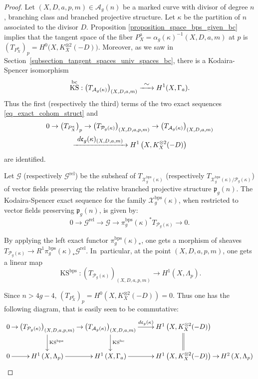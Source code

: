 \documentclass[10pt]{amsart}
\newcommand\To[1]{\mathchoice{\xrightarrow{\textstyle\kern4pt#1\kern3pt}}{\stackrel{#1}{\longrightarrow}}{}{}}
\newcommand{\BC}{\mathrm{bc}}
\newcommand{\BPS}{\mathrm{bps}}
\newcommand{\rel}{\mathrm{rel}}
\DeclareMathOperator{\KS}{KS}
\theoremstyle{definition}
\theoremstyle{plain}
\begin{document}
\begin{proof}
Let $(X, D, a, p, m) \in \mathcal A_g(n)$ be a marked curve with divisor of degree $n$, branching class and branched projective structure.
Let $\kappa$ be the partition of $n$ associated to the divisor $D$.
Proposition \ref{proposition_space_bps_given_bc} implies that the tangent space of the fiber $P_X^{a} = \alpha_g(\kappa)^{-1}(X, D, a, m)$ at $p$ is $(T_{P_X^a})_p = H^0\bigl(X, K_X^{\otimes 2}(-D)\bigr)$.
Moreover, as we saw in Section~\ref{subsection_tangent_spaces_univ_spaces_bc}, there is a Kodaira-Spencer isomorphism
\[
\KS^{\BC}: \left(T_{\mathcal A_g(\kappa)}\right)_{(X, D, a, m)} \To{\sim} H^1(X, \Gamma_a).
\]
Thus the first (respectively the third) terms of the two exact sequences \eqref{eq_exact_cohom_struct} and
\begin{multline*}
0 \to \left(T_{P_X^a}\right)_p \to \left(T_{\mathcal P_g(\kappa)}\right)_{(X, D, a, p, m)} \to \left(T_{\mathcal A_g(\kappa)}\right)_{(X, D, a, m)}\\
\To{d\mathfrak c_g(\kappa)_{(X, D, a, m)}} H^1\left(X, K_X^{\otimes 2}(-D)\right)
\end{multline*}
are identified.

Let $\mathcal G$ (respectively $\mathcal G^{\rel}$) be the subsheaf of $T_{\mathcal X_g^{\BPS}(\kappa)}$ (respectively $T_{\mathcal X_g^{\BPS}(\kappa)/\mathcal P_g(\kappa)}$) of vector fields preserving the relative branched projective structure $\mathfrak p_g(n)$.
The Kodaira-Spencer exact sequence for the family $\mathcal X^{\BPS}_g(\kappa)$, when restricted to vector fields preserving $\mathfrak p_g(n)$, is given by:
\begin{equation*}
0 \to \mathcal G^{\rel} \to \mathcal G \to \pi_g^{\BPS}(\kappa)^* T_{\mathcal P_g(\kappa)} \to 0.
\end{equation*}

By applying the left exact functor $\pi_g^{\BPS}(\kappa)_*$, one gets a morphism of sheaves $T_{\mathcal P_g(\kappa)} \to R^1 \pi_g^{\BPS}(\kappa)_* \mathcal G^{\rel}$. In~particular, at the point $(X, D, a, p, m)$, one gets a linear map
\begin{equation}\label{eq_kodaira_spencer_4}
\KS^{\BPS}: \left(T_{\mathcal P_g(\kappa)}\right)_{(X, D, a, p, m)} \to H^1(X, \Lambda_p).
\end{equation}

Since $n > 4g-4$, $\left(T_{P_X^a}\right)_p = H^0\left(X, K_X^{\otimes 2}(-D)\right) = 0$.
Thus one has the following diagram, that is easily seen to be commutative:
\begin{equation*}
\xymatrix@C=.3cm{
0 \ar[r] & \left(T_{\mathcal P_g(\kappa)}\right)_{(X, D, a, p, m)} \ar[d]^{\KS^{\BPS}} \ar[r] & \left(T_{\mathcal A_g(\kappa)}\right)_{(X, D, a, m)} \ar[d]^{\KS^{\BC}} \ar[rr]^-{d\mathfrak c_g(\kappa)} && H^1\left(X, K_X^{\otimes 2}(-D)\right) \ar@{=}[d] \\
0 \ar [r] & H^1\left(X, \Lambda_p\right) \ar[r] & H^1\left(X, \Gamma_a\right) \ar[rr]&& H^1\left(X, K_X^{\otimes 2}(-D)\right)\ar[r]&H^2\left(X, \Lambda_p\right)
}
\end{equation*}


\end{proof}
\end{document}
